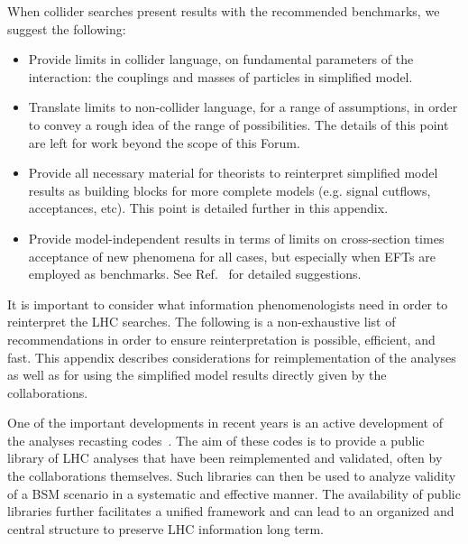  When collider searches present results with the recommended benchmarks, we suggest the following:
 \begin{itemize}
 \item Provide limits in collider language, on fundamental parameters of
 the interaction: the couplings and masses of particles in simplified model.
 \item Translate limits to non-collider language, for a range of
 assumptions, in order to convey a rough idea of the range of
 possibilities. The details of this point are left for work beyond the scope of this Forum. 
 \item Provide all necessary material for theorists to reinterpret simplified
 model results as building blocks for more complete models (e.g. signal cutflows,
 acceptances, etc). This point is detailed further in this appendix.
\item Provide model-independent results in terms of limits on
  cross-section times acceptance of new phenomena for all cases, but
  especially when EFTs are employed as benchmarks. See
  Ref.~\cite{Kraml:2012sg} for detailed suggestions.
 \end{itemize}

It is important to consider what information phenomenologists need in order to reinterpret the LHC searches. The following is a non-exhaustive list of recommendations in order to ensure reinterpretation is possible, efficient, and fast. This appendix describes considerations for reimplementation of the analyses as well as for using the simplified model results directly given by the collaborations. 

One of the important developments in recent years is an active development of the analyses recasting codes~\cite{Dumont:2014tja, Conte:2014zja, Kim:2015wza,Cranmer:2010hk,ATOM}. The aim of these codes is to provide a public library of LHC analyses that have been reimplemented and validated, often by the collaborations themselves. Such libraries can then be used to analyze validity of a BSM scenario in a systematic and effective manner. The availability of public libraries further facilitates a unified framework and can lead to an organized and central structure to preserve LHC information long term.

